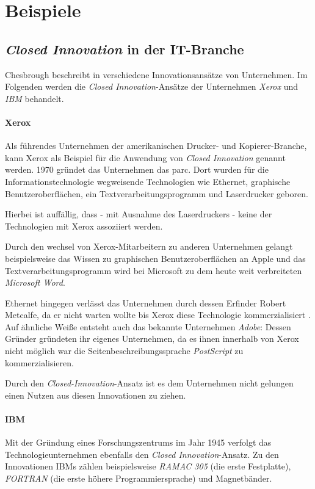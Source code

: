 \section{Beispiele}\label{sec:beispiele}

\subsection{\textit{Closed Innovation} in der IT-Branche}\label{sec:beispiele-unternehmen}
Chesbrough beschreibt in \cite{chesbrough2003} verschiedene Innovationsansätze von Unternehmen.
Im Folgenden werden die \textit{Closed Innovation}-Ansätze der Unternehmen \textit{Xerox} und \textit{IBM} behandelt.

\paragraph{Xerox \cite[1\psqq]{chesbrough2003}}
Als führendes Unternehmen der amerikanischen Drucker- und Kopierer-Branche,
kann Xerox als Beispiel für die Anwendung von \textit{Closed Innovation} genannt werden.
1970 gründet das Unternehmen das \ac{parc}.
Dort wurden für die Informationstechnologie wegweisende Technologien wie
Ethernet, graphische Benutzeroberflächen, ein Textverarbeitungsprogramm und Laserdrucker geboren.

Hierbei ist auffällig, dass - mit Ausnahme des Laserdruckers - keine der Technologien mit Xerox
assoziiert werden.

Durch den wechsel von Xerox-Mitarbeitern zu anderen Unternehmen
gelangt beispielsweise das Wissen zu graphischen Benutzeroberflächen an Apple
und das Textverarbeitungsprogramm wird bei Microsoft zu dem heute weit verbreiteten \textit{Microsoft Word}.

Ethernet hingegen verlässt das Unternehmen durch dessen Erfinder Robert Metcalfe,
da er nicht warten wollte bis Xerox diese Technologie kommerzialisiert \cite[81]{chesbrough2003}.
Auf ähnliche Weiße entsteht auch das bekannte Unternehmen \textit{Adobe}:
Dessen Gründer gründeten ihr eigenes Unternehmen,
da es ihnen innerhalb von Xerox nicht möglich war
die Seitenbeschreibungssprache \textit{PostScript} zu kommerzialisieren.

Durch den \textit{Closed-Innovation}-Ansatz ist es dem Unternehmen nicht gelungen einen Nutzen aus diesen Innovationen zu ziehen.


\paragraph{IBM \cite[93\psqq]{chesbrough2003}}
Mit der Gründung eines Forschungszentrums im Jahr 1945 verfolgt das Technologieunternehmen ebenfalls den \textit{Closed Innovation}-Ansatz.
Zu den Innovationen IBMs zählen beispielsweise
\textit{RAMAC 305} (die erste Festplatte),
\textit{FORTRAN} (die erste höhere Programmiersprache) und
Magnetbänder.

